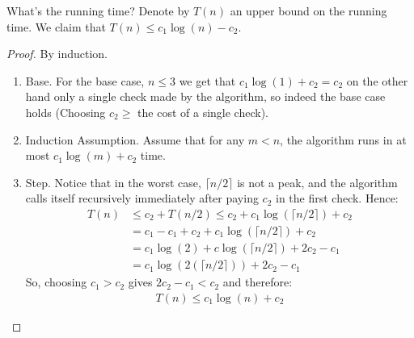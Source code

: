 What's the running time? Denote by $T\left( n \right)$ an upper bound on the running time. We claim that $T(n) \le c_{1} \log (n) - c_{2}$. 
\begin{proof}
  By induction. 
\begin{enumerate}
  \item Base. For the base case, $n \le 3$ we get that $c_{1} \log(1) + c_{2} =  c_{2}$ on the other hand only a single check made by the algorithm, so indeed the base case holds (Choosing $c_{2} \ge$ the cost of a single check).
  \item Induction Assumption. Assume that for any $m < n$, the algorithm runs in at most $c_{1} \log(m) + c_{2}$ time.
  \item Step. Notice that in the worst case, $\lceil n/2 \rceil$ is not a peak, and the algorithm calls itself recursively immediately after paying $c_{2}$ in the first check. Hence: \begin{equation*}
      \begin{split}    
	T\left(n\right) & \le c_{2} + T\left(n/2\right) \le c_{2} + c_{1} \log\left( \lceil n/2 \rceil \right) + c_{2}\\
	& = c_{1} - c_{1} + c_{2} + c_{1} \log\left( \lceil n/2 \rceil \right) + c_{2}\\
	& = c_{1} \log (2) +  c \log\left( \lceil n/2 \rceil  \right) + 2c_{2} - c_{1} \\
	& = c_{1} \log\left(2 \left(\lceil n/2 \rceil \right) \right) + 2c_{2} - c_{1}
      \end{split}
    \end{equation*}
    So, choosing $c_{1} > c_{2}$ gives $2c_{2} - c_{1} < c_{2}$ and therefore:
    \begin{equation*}
      \begin{split}
	T\left(n\right) \le c_{1} \log \left( n  \right) + c_{2}  
      \end{split}
    \end{equation*}
\end{enumerate}
\end{proof}




